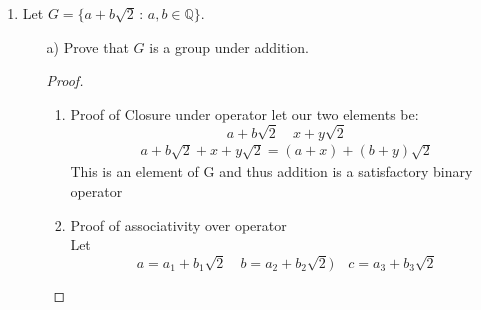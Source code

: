 \documentclass[11pt]{article}
\theoremstyle{definition}  %
\newcommand{\Q}{\mathbb{Q}}
\begin{document}
\begin{enumerate}
\begin{proof}
\begin{enumerate}
    \item Proof of existence of identity element
    The identity element of this set under the operation of multiplication is the number 1 which is an element of $\mathbb{C}$ This is because:
  \[
    \forall z \in \mathbb{C}\quad  1^nz^n=z^n
  \]
    \item  Proof of existence of inverse of operator\\
    The inverse of a given element in G would be the term:
    \[
      \tilde{z}=\left(\frac{1}{z}\right)^n=\frac{1}{z^n}
    \]
    $\tilde{z}\in \G$ by the fact that:
    \begin{align*}
      &z^n=1\\
      &1=\frac{1}{z^n}
    \end{align*}
  \end{enumerate}
  Thus we have shown that this set with the binary operator of addition form a group.
\end{proof}
\item Let $G = \{ a + b\sqrt{2} \, : \, a, b \in \Q\}$.
  \begin{itemize}
  \item[a)] Prove that $G$ is a group under addition.
  \begin{proof}
    \begin{enumerate}
       \item Proof of Closure under operator
       let our two elements be:
       \[
         a+b\sqrt{2}\quad x+y\sqrt{2}
       \]
       \begin{align*}
         a+b\sqrt{2}+x+y\sqrt{2}=(a+x)+(b+y)\sqrt{2}
       \end{align*}
       This is an element of G and thus addition is a satisfactory binary operator
      \item Proof of associativity over operator\\
      Let
      \[
        a=a_1+b_1\sqrt{2}\quad b=a_2+b_2\sqrt{2})\quad c= a_3+b_3\sqrt{2}
      \]


\end{enumerate}
\end{proof}
\end{itemize}
\end{enumerate}
\end{document}
